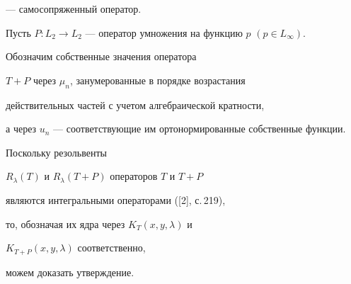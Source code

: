 --- самосопряженный оператор.





Пусть $P:L_2\to L_2$ --- оператор умножения на функцию $p$ $(p\in L_\infty)$.


Обозначим собственные значения оператора


$T+P$ через $\mu_n$, занумерованные в порядке возрастания


действительных частей с учетом алгебраической кратности,


а через $u_n$ --- соответствующие им ортонормированные собственные функции.





Поскольку резольвенты


$R_\lambda(T)$ и $R_\lambda({T+P})$ операторов $T$ и $T+P$


являются интегральными операторами ([2], с.\,219),


то, обозначая их ядра через $K_T(x,y,\lambda)$ и


$K_{T+P}(x,y,\lambda)$ соответственно,


можем доказать утверждение.





